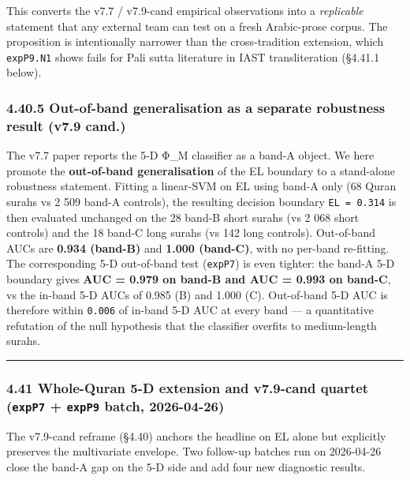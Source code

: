 \documentclass[
]{article}
\begin{document}
This converts the v7.7 / v7.9-cand empirical observations into a
\emph{replicable} statement that any external team can test on a fresh
Arabic-prose corpus. The proposition is intentionally narrower than the
cross-tradition extension, which \texttt{expP9.N1} shows fails for Pali
sutta literature in IAST transliteration (§4.41.1 below).

\subsubsection{4.40.5 Out-of-band generalisation as a separate
robustness result (v7.9
cand.)}\label{out-of-band-generalisation-as-a-separate-robustness-result-v7.9-cand.}

The v7.7 paper reports the 5-D Φ\_M classifier as a band-A object. We
here promote the \textbf{out-of-band generalisation} of the EL boundary
to a stand-alone robustness statement. Fitting a linear-SVM on EL using
band-A only (68 Quran surahs vs 2 509 band-A controls), the resulting
decision boundary \texttt{EL\ =\ 0.314} is then evaluated unchanged on
the 28 band-B short surahs (vs 2 068 short controls) and the 18 band-C
long surahs (vs 142 long controls). Out-of-band AUCs are \textbf{0.934
(band-B)} and \textbf{1.000 (band-C)}, with no per-band re-fitting. The
corresponding 5-D out-of-band test (\texttt{expP7}) is even tighter: the
band-A 5-D boundary gives \textbf{AUC = 0.979 on band-B and AUC = 0.993
on band-C}, vs the in-band 5-D AUCs of 0.985 (B) and 1.000 (C).
Out-of-band 5-D AUC is therefore within \texttt{0.006} of in-band 5-D
AUC at every band --- a quantitative refutation of the null hypothesis
that the classifier overfits to medium-length surahs.

\begin{center}\rule{0.5\linewidth}{0.5pt}\end{center}

\subsubsection{\texorpdfstring{4.41 Whole-Quran 5-D extension and
v7.9-cand quartet (\texttt{expP7} + \texttt{expP9} batch,
2026-04-26)}{4.41 Whole-Quran 5-D extension and v7.9-cand quartet (expP7 + expP9 batch, 2026-04-26)}}\label{whole-quran-5-d-extension-and-v7.9-cand-quartet-expp7-expp9-batch-2026-04-26}

The v7.9-cand reframe (§4.40) anchors the headline on EL alone but
explicitly preserves the multivariate envelope. Two follow-up batches
run on 2026-04-26 close the band-A gap on the 5-D side and add four new
diagnostic results.
\end{document}
